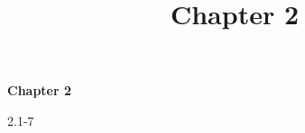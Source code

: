 \documentclass[14pt]{article}
\theoremstyle{definition}
\theoremstyle{remark}
\numberwithin{equation}{section}
\numberwithin{theorem}{section}
\begin{document}
\setcounter{section}{0}
\title{Chapter 2}

\thispagestyle{empty}
\begin{center}
{\LARGE \bf Chapter 2}
\end{center}

\begin{exercise}{2.1-7}

\end{exercise}
\end{document}
